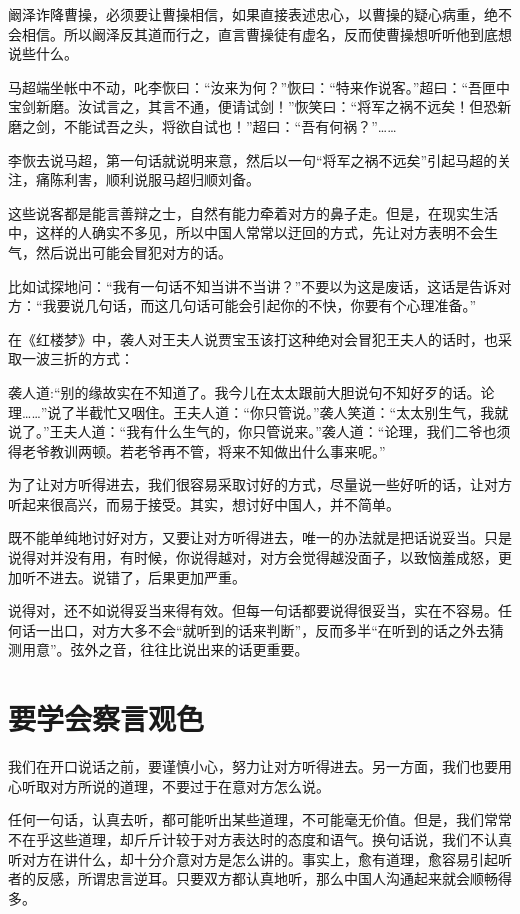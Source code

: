 \documentclass[fontset=fandol, a4paper, 12pt, openright]{ctexbook}
\begin{document}
阚泽诈降曹操，必须要让曹操相信，如果直接表述忠心，以曹操的疑心病重，绝不会相信。所以阚泽反其道而行之，直言曹操徒有虚名，反而使曹操想听听他到底想说些什么。

马超端坐帐中不动，叱李恢曰：“汝来为何？”恢曰：“特来作说客。”超曰：“吾匣中宝剑新磨。汝试言之，其言不通，便请试剑！”恢笑曰：“将军之祸不远矣！但恐新磨之剑，不能试吾之头，将欲自试也！”超曰：“吾有何祸？”……

李恢去说马超，第一句话就说明来意，然后以一句“将军之祸不远矣”引起马超的关注，痛陈利害，顺利说服马超归顺刘备。

这些说客都是能言善辩之士，自然有能力牵着对方的鼻子走。但是，在现实生活中，这样的人确实不多见，所以中国人常常以迂回的方式，先让对方表明不会生气，然后说出可能会冒犯对方的话。

比如试探地问：“我有一句话不知当讲不当讲？”不要以为这是废话，这话是告诉对方：“我要说几句话，而这几句话可能会引起你的不快，你要有个心理准备。”

在《红楼梦》中，袭人对王夫人说贾宝玉该打这种绝对会冒犯王夫人的话时，也采取一波三折的方式：

袭人道:“别的缘故实在不知道了。我今儿在太太跟前大胆说句不知好歹的话。论理……”说了半截忙又咽住。王夫人道：“你只管说。”袭人笑道：“太太别生气，我就说了。”王夫人道：“我有什么生气的，你只管说来。”袭人道：“论理，我们二爷也须得老爷教训两顿。若老爷再不管，将来不知做出什么事来呢。”

为了让对方听得进去，我们很容易采取讨好的方式，尽量说一些好听的话，让对方听起来很高兴，而易于接受。其实，想讨好中国人，并不简单。

既不能单纯地讨好对方，又要让对方听得进去，唯一的办法就是把话说妥当。只是说得对并没有用，有时候，你说得越对，对方会觉得越没面子，以致恼羞成怒，更加听不进去。说错了，后果更加严重。

说得对，还不如说得妥当来得有效。但每一句话都要说得很妥当，实在不容易。任何话一出口，对方大多不会“就听到的话来判断”，反而多半“在听到的话之外去猜测用意”。弦外之音，往往比说出来的话更重要。

\section{要学会察言观色}

我们在开口说话之前，要谨慎小心，努力让对方听得进去。另一方面，我们也要用心听取对方所说的道理，不要过于在意对方怎么说。

任何一句话，认真去听，都可能听出某些道理，不可能毫无价值。但是，我们常常不在乎这些道理，却斤斤计较于对方表达时的态度和语气。换句话说，我们不认真听对方在讲什么，却十分介意对方是怎么讲的。事实上，愈有道理，愈容易引起听者的反感，所谓忠言逆耳。只要双方都认真地听，那么中国人沟通起来就会顺畅得多。
\end{document}
